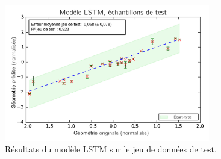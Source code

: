 \begin{figure}[bthp]
	\centering
	\includegraphics[width=0.8\textwidth]{../Chap2/Figures/1LSTM_Cross_val_MSE_013splited_Ystd.png}
	\caption{Résultats du modèle LSTM sur le jeu de données de test.}
	\label{fig:signals_lstm}
\end{figure}


